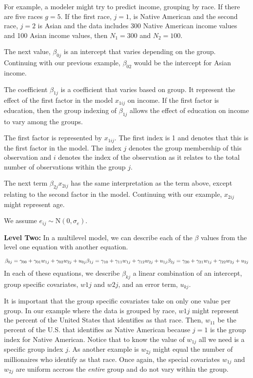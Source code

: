\documentclass[
]{article}
\begin{document}
For example, a modeler might try to predict income, grouping by race. If
there are five races \(g = 5\). If the first race, \(j=1\), is Native
American and the second race, \(j=2\) is Asian and the data includes 300
Native American income values and 100 Asian income values, then
\(N_1 = 300\) and \(N_2=100\).

The next value, \(\beta_{0j}\) is an intercept that varies depending on
the group. Continuing with our previous example, \(\beta_{02}\) would be
the intercept for Asian income.

The coefficient \(\beta_{1j}\) is a coefficient that varies based on
group. It represent the effect of the first factor in the model
\(x_{1ij}\) on income. If the first factor is education, then the group
indexing of \(\beta_{1j}\) allows the effect of education on income to
vary among the groups.

The first factor is represented by \(x_{1ij}\). The first index is 1 and
denotes that this is the first factor in the model. The index \(j\)
denotes the group membership of this observation and \(i\) denotes the
index of the observation as it relates to the total number of
observations within the group \(j\).

The next term \(\beta_{2j} x_{2ij}\) has the same interpretation as the
term above, except relating to the second factor in the model.
Continuing with our example, \(x_{2ij}\) might represent age.

We assume \(e_{ij} \sim \text{N}(0, \sigma_e)\).

\textbf{Level Two: } In a multilevel model, we can describe each of the
\(\beta\) values from the level one equation with another equation.

\[
\beta_{0j} = \gamma_{00} + \gamma_{01}w_{1j} + \gamma_{02}w_{2j} + u_{0j} \\
\beta_{1j} = \gamma_{10} + \gamma_{11}w_{1j} + \gamma_{12}w_{2j} + u_{1j} \\
\beta_{2j} = \gamma_{20} + \gamma_{21}w_{1j} + \gamma_{22}w_{2j} + u_{2j} \\
\] In each of these equations, we describe \(\beta_{kj}\) a linear
combination of an intercept, group specific covariates, \(w1j\) and
\(w2j\), and an error term, \(u_{kj}\).

It is important that the group specific covariates take on only one
value per group. In our example where the data is grouped by race,
\(w1j\) might represent the percent of the United States that identifies
as that race. Then, \(w_{11}\) be the percent of the U.S. that
identifies as Native American because \(j=1\) is the group index for
Native American. Notice that to know the value of \(w_{1j}\) all we need
is a specific group index \(j\). As another example is \(w_{2j}\) might
equal the number of millionaires who identify as that race. Once again,
the special covariates \(w_{1j}\) and \(w_{2j}\) are uniform accross the
\emph{entire} group and do not vary within the group.
\end{document}
